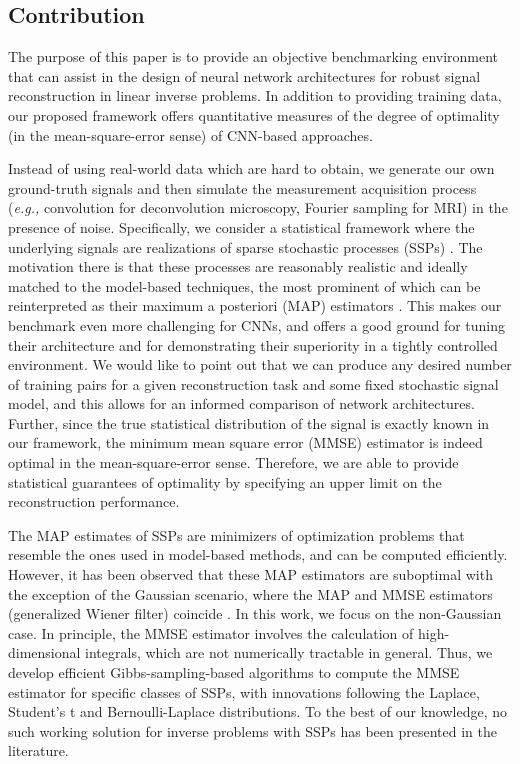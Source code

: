 \documentclass[journal]{IEEEtran}
\begin{document}
\subsection{Contribution}
The purpose of this paper is to provide an objective benchmarking environment 
that can assist in the design of neural network architectures for robust signal reconstruction in linear inverse problems. In addition to providing training data, our proposed framework offers quantitative measures of the degree of optimality (in the mean-square-error sense) of CNN-based approaches.

Instead of using real-world data which are hard to obtain, we generate our own ground-truth signals and then simulate the measurement acquisition process (\textit{e.g.,} convolution for deconvolution microscopy, Fourier sampling for MRI) in the presence of noise. Specifically, we consider a statistical framework where the underlying signals are realizations of sparse stochastic processes (SSPs) \cite{unser2014ssp}. The motivation there is that these processes are reasonably realistic and ideally matched to the model-based techniques, the most prominent of which can be reinterpreted as their maximum a posteriori (MAP) estimators \cite{kamilov2012mmse}. This makes our benchmark even more challenging for CNNs, and offers a good ground for tuning their architecture and for demonstrating their superiority in a tightly controlled environment. We would like to point out that we can produce any desired number of training pairs for a given reconstruction task and some fixed stochastic signal model, and this allows for an informed comparison of network architectures. Further, since the true statistical distribution of the signal is exactly known in our framework, the minimum mean square error (MMSE) estimator is indeed optimal in the mean-square-error sense. Therefore, we are able to provide statistical guarantees of optimality by specifying an upper limit on the reconstruction performance.

The MAP estimates of SSPs are minimizers of optimization problems that resemble the ones used in model-based methods, and can be computed efficiently. However, it has been observed that these MAP estimators are suboptimal \cite{kamilov2012mmse,amini2012bayesian} with the exception of the Gaussian scenario, where the MAP and MMSE estimators (generalized Wiener filter) coincide \cite{kay1993fundamentals}. In this work, we focus on the non-Gaussian case. In principle, the MMSE estimator involves the calculation of high-dimensional integrals, which are not numerically tractable in general. Thus, we develop efficient Gibbs-sampling-based algorithms to compute the MMSE estimator for specific classes of SSPs, with innovations following the Laplace, Student's t and Bernoulli-Laplace distributions. To the best of our knowledge, no such working solution for inverse problems with SSPs has been presented in the literature.
\end{document}
